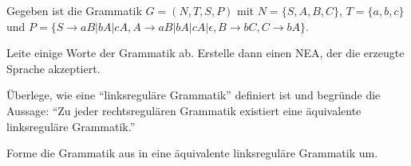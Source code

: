 \documentclass[fontsize=10pt, a4paper, ngerman]{scrartcl}
\begin{document}
\begin{aufgabe}[icon=\iconEinzel\,\iconHeft]
	\label{aufg:grammatik-zu-nea}
	Gegeben ist die Grammatik $G = (N, T, S, P)$ mit
	$N = \{ S, A, B, C \}$, $T = \{ a, b, c \}$ und
	$P = \{ S \rightarrow aB | bA | cA, A \rightarrow aB | bA | cA | \epsilon,
	B \rightarrow bC, C \rightarrow bA \}$.

	Leite einige Worte der Grammatik ab. Erstelle dann einen NEA, der die erzeugte
	Sprache akzeptiert.
\end{aufgabe}

\begin{aufgabe}[icon=\iconStern]
	\label{aufg:zusatz-linksreg}
	Überlege, wie eine \enquote{linksreguläre Grammatik} definiert ist und begründe
	 die Aussage: \enquote{Zu jeder rechtsregulären Grammatik existiert eine äquivalente
	 linksreguläre Grammatik.}

	Forme die Grammatik aus  in eine äquivalente
	linksreguläre Grammatik um.
\end{aufgabe}
\end{document}
